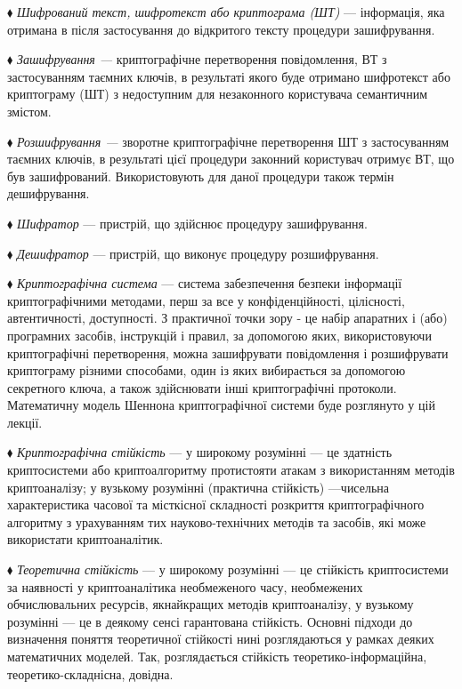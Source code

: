 $\blacklozenge$ \textit{Шифрований текст, шифротекст  або криптограма (ШТ)} ---
інформація, яка отримана в після застосування до відкритого тексту процедури
зашифрування.

$\blacklozenge$ \textit{Зашифрування --- }криптографічне перетворення
повідомлення, ВТ з застосуванням таємних ключів, в результаті якого буде
отримано \textit{ }шифротекст  або криптограму (ШТ) з недоступним для
незаконного користувача семантичним змістом.

$\blacklozenge$ \textit{Розшифрування --- }зворотне \textit{ }криптографічне
перетворення ШТ з застосуванням таємних ключів, в результаті цієї процедури
законний користувач отримує ВТ, що був зашифрований.  Використовують для даної
процедури також термін дешифрування.

$\blacklozenge$ \textit{Шифратор }--- пристрій, що здійснює процедуру
зашифрування.

$\blacklozenge$ \textit{Дешифратор }--- пристрій, що виконує процедуру
розшифрування.

$\blacklozenge$ \textit{Криптографічна система }--- система забезпечення безпеки
інформації криптографічними методами, перш за все у конфіденційності,
цілісності, автентичності, доступності. З практичної точки зору -  це набір
апаратних і (або) програмних засобів, інструкцій і правил, за допомогою яких,
використовуючи криптографічні перетворення, можна зашифрувати  повідомлення і
розшифрувати криптограму різними способами, один із яких вибирається за
допомогою секретного ключа, а також здійснювати інші криптографічні протоколи.
Математичну модель Шеннона криптографічної системи буде розглянуто у цій
лекції.

$\blacklozenge$ \textit{Криптографічна стійкість }--- у широкому розумінні --- це
здатність криптосистеми або криптоалгоритму протистояти атакам з використанням
методів криптоаналізу; у вузькому розумінні (практична стійкість) ---чисельна
характеристика часової та місткісної складності розкриття криптографічного
алгоритму з урахуванням тих науково-технічних методів та засобів, які може
використати криптоаналітик.

$\blacklozenge$ \textit{Теоретична стійкість }---  у широкому розумінні --- це
стійкість криптосистеми за наявності у криптоаналітика необмеженого часу,
необмежених обчислювальних ресурсів, якнайкращих методів криптоаналізу, у
вузькому розумінні --- це в деякому сенсі гарантована стійкість. Основні підходи
до визначення поняття теоретичної стійкості нині розглядаються у рамках деяких
математичних моделей. Так, розглядається стійкість теоретико-інформаційна,
теоретико-складнісна, довідна. 

